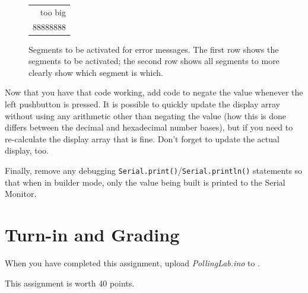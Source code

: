 \begin{figure}
    \centering
    {\dviiseg \huge \begin{tabular}{r} too big \\
                                      88888888 \\
                                    \end{tabular}}
    \caption{Segments to be activated for error messages.
        The first row shows the segments to be activated;
        the second row shows all segments to more clearly show which segment is
        which. \label{fig:SevenSegmentError}}
\end{figure}

Now that you have that code working, add code to negate the value whenever the
left pushbutton is pressed. It is possible to quickly update the display array
without using any arithmetic other than negating the value (how this is done
differs between the decimal and hexadecimal number bases), but if you need to
re-calculate the display array that is fine. Don't forget to update the actual
display, too.

Finally, remove any debugging
\lstinline{Serial.print()}/\lstinline{Serial.println()} statements so that when
in builder mode, only the value being built is printed to the Serial Monitor.

\section*{Turn-in and Grading}

When you have completed this assignment, upload \textit{PollingLab.ino} to
\filesubmission.

This assignment is worth 40 points. \\

